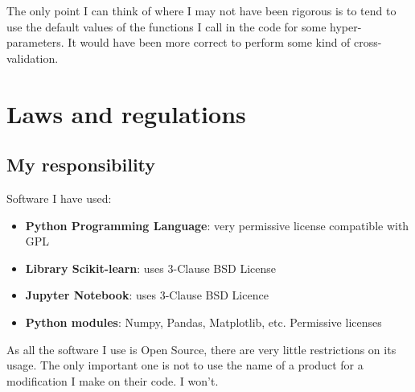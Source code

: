 \documentclass{article}
\begin{document}
    The only point I can think of where I may not have been rigorous is to
    tend to use the default values of the functions I call in the code for
    some hyper-parameters. It would have been more correct to perform some kind
    of cross-validation.


\section{Laws and regulations}
    \subsection{My responsibility}
    Software I have used:
    \begin{itemize}
        \item \textbf{Python Programming Language}: very permissive license
        compatible with GPL\cite{python_licence}
        \item \textbf{Library Scikit-learn}: uses 3-Clause BSD License\cite{scikit_license}
        \item \textbf{Jupyter Notebook}: uses 3-Clause BSD Licence\cite{jupyter_license}
        \item \textbf{Python modules}: Numpy, Pandas, Matplotlib, etc. Permissive
        licenses
    \end{itemize}
    As all the software I use is Open Source, there are very little restrictions
    on its usage. The only important one is not to use the name of a product for a modification
    I make on their code. I won't.
\end{document}
